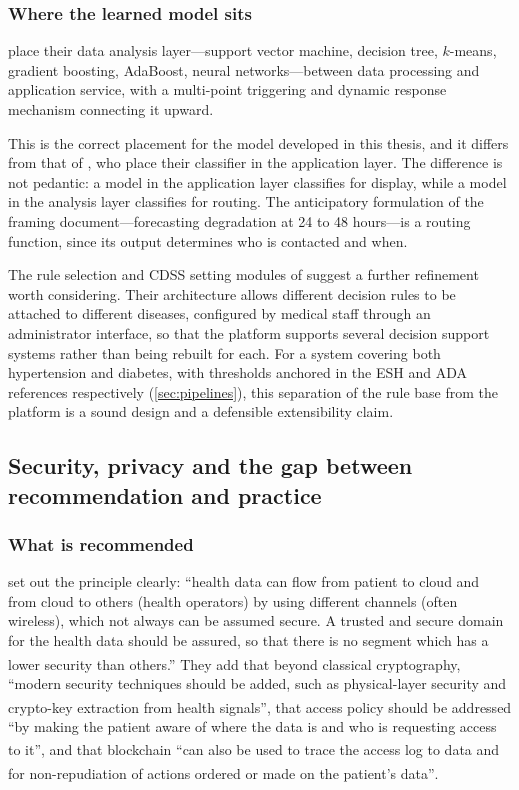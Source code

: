 \documentclass[12pt,a4paper,oneside]{report}
\newcommand{\bq}[1]{``#1''\textsuperscript{\dag}}
\begin{document}
\subsubsection{Where the learned model sits}

\Textcite{liu2025review} place their data analysis layer---support vector machine, decision tree, $k$-means, gradient boosting, AdaBoost, neural networks---between data processing and application service, with a multi-point triggering and dynamic response mechanism connecting it upward.

This is the correct placement for the model developed in this thesis, and it differs from that of \textcite{efendi2025}, who place their classifier in the application layer. The difference is not pedantic: a model in the application layer classifies for display, while a model in the analysis layer classifies for routing. The anticipatory formulation of the framing document---forecasting degradation at 24 to 48 hours---is a routing function, since its output determines who is contacted and when.

The rule selection and CDSS setting modules of \textcite{yazdani2018} suggest a further refinement worth considering. Their architecture allows different decision rules to be attached to different diseases, configured by medical staff through an administrator interface, so that the platform supports several decision support systems rather than being rebuilt for each. For a system covering both hypertension and diabetes, with thresholds anchored in the ESH and ADA references respectively (\cref{sec:pipelines}), this separation of the rule base from the platform is a sound design and a defensible extensibility claim.

\subsection{Security, privacy and the gap between recommendation and practice}\label{sec:security}

\subsubsection{What is recommended}

\Textcite{mucchi2021} set out the principle clearly: \bq{health data can flow from patient to cloud and from cloud to others (health operators) by using different channels (often wireless), which not always can be assumed secure. A trusted and secure domain for the health data should be assured, so that there is no segment which has a lower security than others.} They add that beyond classical cryptography, \bq{modern security techniques should be added, such as physical-layer security and crypto-key extraction from health signals}, that access policy should be addressed \bq{by making the patient aware of where the data is and who is requesting access to it}, and that blockchain \bq{can also be used to trace the access log to data and for non-repudiation of actions ordered or made on the patient's data}.
\end{document}
